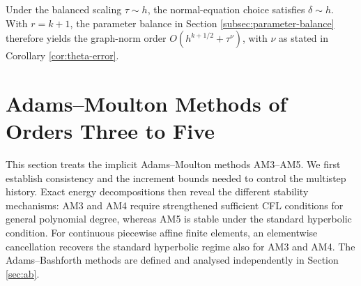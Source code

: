 \documentclass[11pt]{article}
\begin{document}
Under the balanced scaling \(\tau\sim h\), the normal-equation choice satisfies
\(\delta\sim h\). With \(r=k+1\), the parameter balance in Section
\ref{subsec:parameter-balance} therefore yields the graph-norm order
\(O(h^{k+1/2}+\tau^\nu)\), with \(\nu\) as stated in Corollary
\ref{cor:theta-error}.


\section{Adams--Moulton Methods of Orders Three to Five}
\label{sec:adams-moulton}
This section treats the implicit Adams--Moulton methods AM3--AM5. We first
establish consistency and the increment bounds needed to control the
multistep history. Exact energy decompositions then reveal the different
stability mechanisms: AM3 and AM4 require strengthened sufficient CFL
conditions for general polynomial degree, whereas AM5 is stable under the
standard hyperbolic condition. For continuous piecewise affine finite
elements, an elementwise cancellation recovers the standard hyperbolic regime
also for AM3 and AM4. The Adams--Bashforth methods are defined and analysed
independently in Section \ref{sec:ab}.
\end{document}
